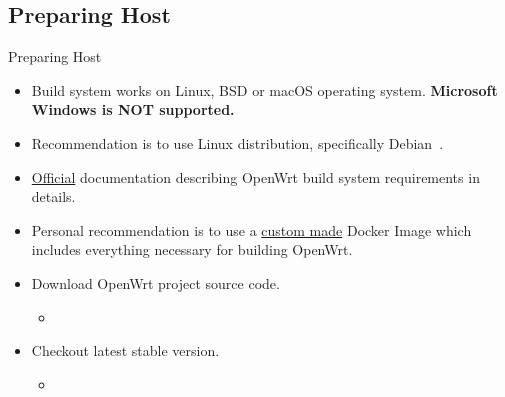 \subsection{Preparing Host}
\begin{frame}{Preparing Host}
    \pause
    \begin{itemize}[<+-|alert@+>]
        \item Build system works on Linux, BSD or macOS operating system. \textbf{Microsoft Windows is NOT supported.}
        \item Recommendation is to use Linux distribution, specifically Debian~\cite{debian-website}.
        \item \href{https://openwrt.org/docs/guide-developer/build-system/install-buildsystem}{Official} documentation describing OpenWrt build system requirements in details.
        \item Personal recommendation is to use a \href{https://github.com/hvarga/openwrt-application-development/blob/master/presentation/resources/Dockerfile}{custom made} Docker Image which includes everything necessary for building OpenWrt.
        \item Download OpenWrt project source code.
        \begin{itemize}
        \item {}
        \end{itemize}
        \item Checkout latest stable version.
        \begin{itemize}
            \item {}
        \end{itemize}
    \end{itemize}
\end{frame}

